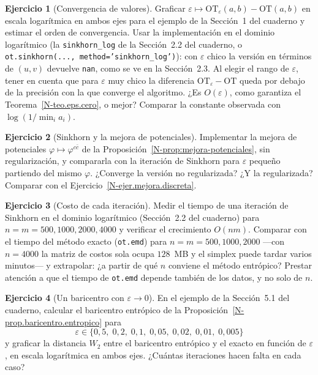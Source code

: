 \documentclass[11pt,a4paper]{amsart}
\newcounter{chapter}
\newcommand{\ve}{\varepsilon}
\theoremstyle{remark}
\theoremstyle{definition}
\newtheorem{ejercicio}{Ejercicio}[chapter]
\numberwithin{subsection}{section}
\numberwithin{equation}{section}
\begin{document}
\begin{ejercicio}[Convergencia de valores]\label{ejc.eps.valores}
Graficar $\ve\mapsto\mathrm{OT}_\ve(a,b)-\mathrm{OT}(a,b)$ en escala
logarítmica en ambos ejes para el ejemplo de la Sección~1 del cuaderno y
estimar el orden de convergencia. Usar la implementación en el dominio
logarítmico (la \texttt{sinkhorn\_log} de la Sección~2.2 del cuaderno, o
\texttt{ot.sinkhorn(..., method='sinkhorn\_log')}): con $\ve$ chico la versión
en términos de $(u,v)$ devuelve \texttt{nan}, como se ve en la Sección~2.3.
Al elegir el rango de $\ve$, tener en cuenta que para $\ve$ muy chico la
diferencia $\mathrm{OT}_\ve-\mathrm{OT}$ queda por debajo de la precisión con
la que converge el algoritmo. ¿Es $O(\ve)$, como garantiza el
Teorema~\ref{N-teo.eps.cero}, o mejor? Comparar la constante observada con
$\log(1/\min_ia_i)$.
\end{ejercicio}

\begin{ejercicio}[Sinkhorn y la mejora de potenciales]\label{ejc.eps.mejora}
Implementar la mejora de potenciales $\varphi\mapsto\varphi^{c\bar c}$ de la
Proposición~\ref{N-prop:mejora-potenciales}, sin regularización, y compararla
con la iteración de Sinkhorn para $\ve$ pequeño partiendo del mismo $\varphi$.
¿Converge la versión no regularizada? ¿Y la regularizada? Comparar con el
Ejercicio~\ref{N-ejer.mejora.discreta}.
\end{ejercicio}

\begin{ejercicio}[Costo de cada iteración]\label{ejc.eps.costo}
Medir el tiempo de una iteración de Sinkhorn en el dominio logarítmico
(Sección~2.2 del cuaderno) para $n=m=500,1000,2000,4000$ y verificar el
crecimiento $O(nm)$. Comparar con el tiempo del método exacto
(\texttt{ot.emd}) para $n=m=500,1000,2000$ —con $n=4000$ la matriz de costos
sola ocupa $128$~MB y el simplex puede tardar varios minutos— y extrapolar:
¿a partir de qué $n$ conviene el método entrópico? Prestar atención a que el
tiempo de \texttt{ot.emd} depende también de los datos, y no solo de $n$.
\end{ejercicio}

\begin{ejercicio}[Un baricentro con $\ve\to0$]\label{ejc.eps.baricentro}
En el ejemplo de la Sección~5.1 del cuaderno, calcular el baricentro
entrópico de la Proposición~\ref{N-prop.baricentro.entropico} para
\[
\ve\in\{0{,}5,\;0{,}2,\;0{,}1,\;0{,}05,\;0{,}02,\;0{,}01,\;0{,}005\}
\]
y graficar la distancia $W_2$ entre el baricentro entrópico y el exacto en
función de $\ve$, en escala logarítmica en ambos ejes. ¿Cuántas iteraciones
hacen falta en cada caso?
\end{ejercicio}
\end{document}
